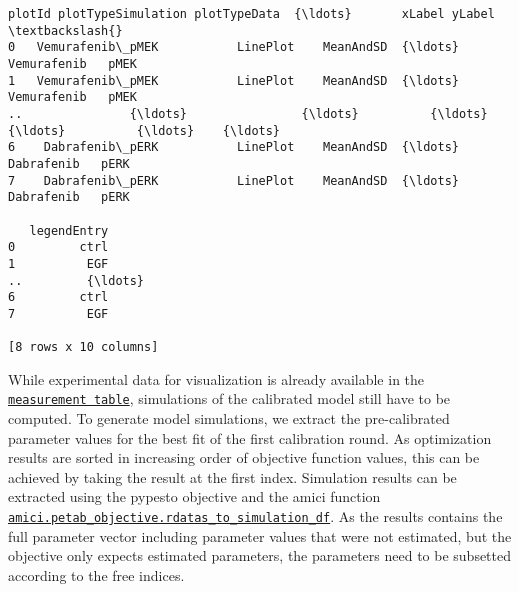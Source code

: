 \documentclass[11pt]{article}
\makeatletter
\newcommand{\boxspacing}{\kern\kvtcb@left@rule\kern\kvtcb@boxsep}
\newcommand{\prompt}[4]{
        \ttfamily\llap{{\color{#2}[#3]:\hspace{3pt}#4}}\vspace{-\baselineskip}
    }
\makeatother
\begin{document}
            \begin{tcolorbox}[breakable, size=fbox, boxrule=.5pt, pad at break*=1mm, opacityfill=0]
\prompt{Out}{outcolor}{31}{\boxspacing}
\begin{Verbatim}[commandchars=\\\{\}]
              plotId plotTypeSimulation plotTypeData  {\ldots}       xLabel yLabel  \textbackslash{}
0   Vemurafenib\_pMEK           LinePlot    MeanAndSD  {\ldots}  Vemurafenib   pMEK
1   Vemurafenib\_pMEK           LinePlot    MeanAndSD  {\ldots}  Vemurafenib   pMEK
..               {\ldots}                {\ldots}          {\ldots}  {\ldots}          {\ldots}    {\ldots}
6    Dabrafenib\_pERK           LinePlot    MeanAndSD  {\ldots}   Dabrafenib   pERK
7    Dabrafenib\_pERK           LinePlot    MeanAndSD  {\ldots}   Dabrafenib   pERK

   legendEntry
0         ctrl
1          EGF
..         {\ldots}
6         ctrl
7          EGF

[8 rows x 10 columns]
\end{Verbatim}
\end{tcolorbox}
        
    While experimental data for visualization is already available in the
\href{https://petab.readthedocs.io/en/latest/documentation_data_format.html\#measurement-table}{\texttt{measurement\ table}},
simulations of the calibrated model still have to be computed. To
generate model simulations, we extract the pre-calibrated parameter
values for the best fit of the first calibration round. As optimization
results are sorted in increasing order of objective function values,
this can be achieved by taking the result at the first index. Simulation
results can be extracted using the pypesto objective and the amici
function
\href{https://amici.readthedocs.io/en/latest/generated/amici.petab_objective.html\#amici.petab_objective.rdatas_to_measurement_df}{\texttt{amici.petab\_objective.rdatas\_to\_simulation\_df}}.
As the results contains the full parameter vector including parameter
values that were not estimated, but the objective only expects estimated
parameters, the parameters need to be subsetted according to the free
indices.
\end{document}
